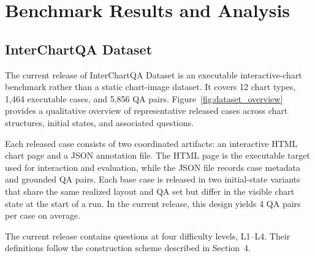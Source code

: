 \documentclass[review,journal,hideappendix]{vgtc} %
\newcommand{\dataset}{InterChartQA}
\begin{document}
\section{Benchmark Results and Analysis}

\subsection{\dataset{} Dataset}

The current release of \dataset{} Dataset is an executable interactive-chart benchmark rather than a static chart-image dataset. It covers 12 chart types, 1,464  executable cases, and 5,856 QA pairs. Figure~\ref{fig:dataset_overview} provides a qualitative overview of representative released cases across chart structures, initial states, and associated questions.

Each released case consists of two coordinated artifacts: an interactive HTML chart page and a JSON annotation file. The HTML page is the executable target used for interaction and evaluation, while the JSON file records case metadata and grounded QA pairs. Each base case is released in two initial-state variants that share the same realized layout and QA set but differ in the visible chart state at the start of a run. In the current release, this design yields 4 QA pairs per case on average.

The current release contains questions at four difficulty levels, L1--L4. Their definitions follow the construction scheme described in Section~4.
\end{document}
